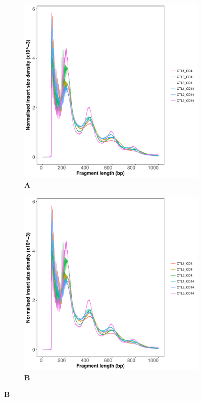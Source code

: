 \begin{figure}[htbp]
\centering
\begin{subfigure}{0.75\textwidth}
\centering
\includegraphics[width=\textwidth]{./Results1/pdfs/ATAC_Core_fresh_CD4_CD14_frag_size_distribution}
\caption{\textbf{A}}
\end{subfigure} %
\begin{subfigure}{0.45\textwidth}
\centering
\includegraphics[width=\textwidth]{./Results1/pdfs/ATAC_Core_fresh_CD4_CD14_frag_size_distribution}
\caption{\textbf{B}}
\end{subfigure}


\end{figure}
